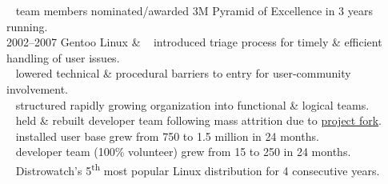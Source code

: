 \documentclass[]{friggeri-cv} %
\begin{document}
\begin{entrylist}
{{\tiny {}} ~ team members nominated/awarded 3M Pyramid of Excellence in 3 years running.\\}
\entry
{2002--2007}
{Gentoo Linux}
{ \& }
{{\tiny {}} ~ introduced triage process for timely \& efficient handling of user issues.\\
{\tiny {}} ~ lowered technical \& procedural barriers to entry for user-community involvement.\\
{\tiny {}} ~ structured rapidly growing organization into functional \& logical teams.\\

{\tiny {}} ~ held \& rebuilt developer team following mass attrition due to \href{http://www.gentoo.org/news/en/gwn/20030630-newsletter.xml}{project fork}.\\

{\tiny {}} ~ installed user base grew from 750 to 1.5 million in 24 months.\\
{\tiny {}} ~ developer team (100\% volunteer) grew from 15 to 250 in 24 months.\\
{\tiny {}} ~ Distrowatch's 5\textsuperscript{th} most popular Linux distribution for 4 consecutive years.}
\end{entrylist}
\end{document}
